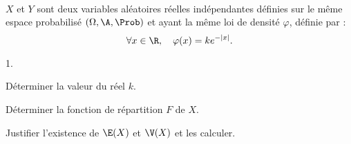 \documentclass[11pt]{article}%
\begin{document}
\begin{exerciceSP}~\\
  $X$ et $Y$ sont deux variables aléatoires réelles indépendantes
  définies sur le même espace probabilisé $(\Omega , \A ,
  \Prob)$ et ayant la même loi de densité $\varphi$, définie par :
  \[
  \forall x \in \R,\ \ \ \varphi(x) = k e^{ - \vert x \vert}.
  \]
  \begin{noliste}{1.}
    \setlength{\itemsep}{2mm}
  \item Déterminer la valeur du réel $k$.
  \item Déterminer la fonction de répartition $F$ de $X$.
  \item Justifier l'existence de $\E(X)$ et $\V(X)$ et les calculer.
  \end{noliste}
\end{exerciceSP}


\newpage
\end{document}
